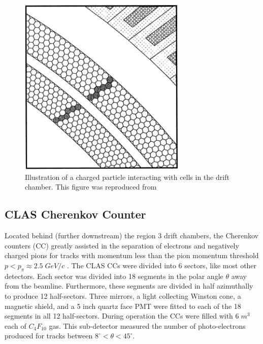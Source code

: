 \begin{figure}
	\centering
		\includegraphics[width=8cm]{image/diagrams/dc-hexagonal-cells.png}
		\caption{Illustration of a charged particle interacting with cells in the drift chamber.  This figure was reproduced from \cite{hardware-mestayer:2000}}
\end{figure}
    
\subsection{CLAS Cherenkov Counter}
Located behind (further downstream) the region 3 drift chambers, the Cherenkov counters (CC) greatly assisted in the separation of electrons and negatively charged pions for tracks with momentum less than the pion momentum threshold $p < p_{\pi} \approx 2.5 \; GeV/c$ \cite{hardware-adams:2001}.  The CLAS CCs were divided into 6 sectors, like most other detectors.  Each sector was divided into 18 segments in the polar angle $\theta$ away from the beamline.  Furthermore, these segments are divided in half azimuthally to produce 12 half-sectors.  Three mirrors, a light collecting Winston cone, a magnetic shield, and a 5 inch quartz face PMT were fitted to each of the 18 segments in all 12 half-sectors.  During operation the CCs were filled with $6 \; m^3$ each of $C_{4} F_{10}$ gas.  This sub-detector measured the number of photo-electrons produced for tracks between $8^\circ < \theta < 45^\circ$.  

